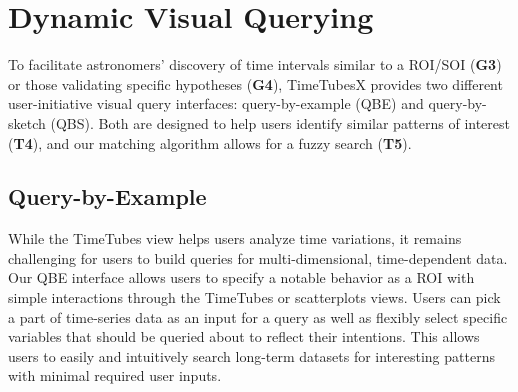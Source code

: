 \section{Dynamic Visual Querying}\label{sec:visualQuery}
To facilitate astronomers' discovery of time intervals similar to a ROI/SOI (\textbf{G3}) or those validating specific hypotheses (\textbf{G4}), 
TimeTubesX provides two different user-initiative visual query interfaces: query-by-example (QBE) and query-by-sketch (QBS).
Both are designed to help users identify similar patterns of interest (\textbf{T4}), and our matching algorithm allows for a fuzzy search (\textbf{T5}).

\subsection{Query-by-Example}\label{sec:QBE}
While the TimeTubes view helps users analyze time variations,
it remains challenging for users to build queries for multi-dimensional, time-dependent data.
Our QBE interface allows users to specify a notable behavior as a ROI with simple interactions through the TimeTubes or scatterplots views.
Users can pick a part of time-series data as an input for a query as well as flexibly select specific variables that should be queried about to reflect their intentions. 
This allows users to easily and intuitively search long-term datasets for interesting patterns with minimal required user inputs.

